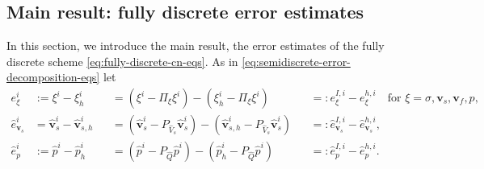 \documentclass[10pt,letterpaper]{amsart}
\theoremstyle{plain} %
\theoremstyle{remark} %
\newcommand{\vect}[1]{\mathbf{#1}}
\begin{document}
%
\subsection{Main result: fully discrete error estimates}\label{ss:fully_discrete_result}
In this section, we introduce the main result, the error estimates of the fully discrete scheme \eqref{eq:fully-discrete-cn-eqs}. As in \eqref{eq:semidiscrete-error-decomposition-eqs} let 
%
\begin{align*}%
	e_{\xi}^i &:= \xi^i - \xi_h^i & &= (\xi^i - \Pi_{\xi} \xi^i) - (\xi_h^i - \Pi_{\xi} \xi^i) & &=: e_{\xi}^{I,i} - e_{\xi}^{h,i}  \quad \text{for } \xi= \sigma, \vect{v}_s, \vect{v}_f, p,
	\\
	\widehat{e}_{\vect{v}_{s}}^i &= \widehat{\vect{v}}_{s}^i - \widehat{\vect{v}}_{s,h}^i & &= (\widehat{\vect{v}}_{s}^i - {P_{\widehat{V}_{s}}} \widehat{\vect{v}}_{s}^i) - (\widehat{\vect{v}}_{s,h}^i - {P_{\widehat{V}_{s}}} \widehat{\vect{v}}_{s}^i) & &=: \widehat{e}_{\vect{v}_{s}}^{I,i} - \widehat{e}_{\vect{v}_{s}}^{h,i} , 
	\\
	\widehat{e}_{p}^i &:= \widehat{p}^i - \widehat{p}_{h}^i & &= (\widehat{p}^i - {P_{\widehat{Q}}} \widehat{p}^i) - (\widehat{p}_{h}^i - {P_{\widehat{Q}}} \widehat{p}^i) & &=: \widehat{e}_{p}^{I,i} - \widehat{e}_{p}^{h,i} .
\end{align*}
%
%
\end{document}

